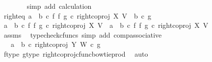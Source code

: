 \begin{isabellebody}
\ \ \ \ \ \ \isamarkupfalse%
\ {\isacharparenleft}{\kern0pt}simp\ add{\isacharcolon}{\kern0pt}\ calculation{\isacharparenright}{\kern0pt}\isanewline
\ \ \isamarkupfalse%
\isanewline
\isanewline
\ \ \isamarkupfalse%
\ right{\isacharunderscore}{\kern0pt}eq{\isacharcolon}{\kern0pt}\ {\isachardoublequoteopen}{\isacharparenleft}{\kern0pt}a\ {\isasymamalg}\ b\ {\isasymcirc}\isactrlsub c\ f\ {\isasymbowtie}\isactrlsub f\ g{\isacharparenright}{\kern0pt}\ {\isasymcirc}\isactrlsub c\ right{\isacharunderscore}{\kern0pt}coproj\ X\ V\ {\isacharequal}{\kern0pt}\ {\isacharparenleft}{\kern0pt}b\ {\isasymcirc}\isactrlsub c\ g{\isacharparenright}{\kern0pt}{\isachardoublequoteclose}\isanewline
\ \ \isamarkupfalse%
\ {\isacharminus}{\kern0pt}\ \isanewline
\ \ \ \ \isamarkupfalse%
\ {\isachardoublequoteopen}{\isacharparenleft}{\kern0pt}a\ {\isasymamalg}\ b\ {\isasymcirc}\isactrlsub c\ f\ {\isasymbowtie}\isactrlsub f\ g{\isacharparenright}{\kern0pt}\ {\isasymcirc}\isactrlsub c\ right{\isacharunderscore}{\kern0pt}coproj\ X\ V\ {\isacharequal}{\kern0pt}\ {\isacharparenleft}{\kern0pt}a\ {\isasymamalg}\ b{\isacharparenright}{\kern0pt}\ {\isasymcirc}\isactrlsub c\ {\isacharparenleft}{\kern0pt}f\ {\isasymbowtie}\isactrlsub f\ g{\isacharparenright}{\kern0pt}\ {\isasymcirc}\isactrlsub c\ right{\isacharunderscore}{\kern0pt}coproj\ X\ V{\isachardoublequoteclose}\isanewline
\ \ \ \ \ \ \isamarkupfalse%
\ assms\ \isamarkupfalse%
\ {\isacharparenleft}{\kern0pt}typecheck{\isacharunderscore}{\kern0pt}cfuncs{\isacharcomma}{\kern0pt}\ simp\ add{\isacharcolon}{\kern0pt}\ comp{\isacharunderscore}{\kern0pt}associative{}{\isacharparenright}{\kern0pt}\isanewline
\ \ \ \ \isamarkupfalse%
\ \isamarkupfalse%
\ {\isachardoublequoteopen}{\isachardot}{\kern0pt}{\isachardot}{\kern0pt}{\isachardot}{\kern0pt}\ {\isacharequal}{\kern0pt}\ {\isacharparenleft}{\kern0pt}a\ {\isasymamalg}\ b{\isacharparenright}{\kern0pt}\ {\isasymcirc}\isactrlsub c\ right{\isacharunderscore}{\kern0pt}coproj\ Y\ W\ {\isasymcirc}\isactrlsub c\ g{\isachardoublequoteclose}\isanewline
\ \ \ \ \ \ \isamarkupfalse%
\ f{\isacharunderscore}{\kern0pt}type\ g{\isacharunderscore}{\kern0pt}type\ right{\isacharunderscore}{\kern0pt}coproj{\isacharunderscore}{\kern0pt}cfunc{\isacharunderscore}{\kern0pt}bowtie{\isacharunderscore}{\kern0pt}prod\ \isamarkupfalse%
\ auto\isanewline
\ \ \ \ \isamarkupfalse%
\ \isamarkupfalse%

\end{isabellebody}
